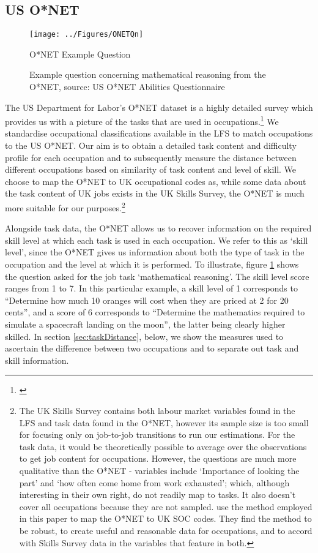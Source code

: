 \documentclass[preprint,12pt,authoryear]{elsarticle}
\begin{document}
\subsection{US O*NET}
\label{sec:ONET}

\begin{figure}[t!]
	\centering
	\texttt{[image: ../Figures/ONETQn]}
	\caption{O*NET Example Question}
	\caption*{\footnotesize{Example question concerning mathematical reasoning from the O*NET, source: US O*NET Abilities Questionnaire}}
	\label{fig:ONETQn}
\end{figure}

The US Department for Labor's O*NET dataset is a highly detailed survey which provides us with a picture of the tasks that are used in occupations.\footnote{\cite{ONET}} We standardise occupational classifications available in the LFS to match occupations to the US O*NET. Our aim is to obtain a detailed task content and difficulty profile for each occupation and to subsequently measure the distance between different occupations based on similarity of task content and level of skill. We choose to map the O*NET to UK occupational codes as, while some data about the task content of UK jobs exists in the UK Skills Survey, the O*NET is much more suitable for our purposes.\footnote{The UK Skills Survey contains both labour market variables found in the LFS and task data found in the O*NET, however its sample size is too small for focusing only on job-to-job transitions to run our estimations. For the task data, it would be theoretically possible to average over the observations to get job content for occupations. However, the questions are much more qualitative than the O*NET - variables include `Importance of looking the part' and `how often come home from work exhausted'; which, although interesting in their own right, do not readily map to tasks. It also doesn't cover all occupations because they are not sampled. \cite{ONETreport} use the method employed in this paper to map the O*NET to UK SOC codes. They find the method to be robust, to create useful and reasonable data for occupations, and to accord with Skills Survey data in the variables that feature in both.} 

Alongside task data, the O*NET allows us to recover information on the required skill level at which each task is used in each occupation. We refer to this as `skill level', since the O*NET gives us information about both the type of task in the occupation and the level at which it is performed. To illustrate, figure \ref{fig:ONETQn} shows the question asked for the job task `mathematical reasoning'. The skill level score ranges from 1 to 7. In this particular example, a skill level of 1 corresponds to ``Determine how much 10 oranges will cost when they are priced at 2 for 20 cents'', and a score of 6 corresponds to ``Determine the mathematics required to simulate a spacecraft landing on the moon'', the latter being clearly higher skilled. In section \ref{sec:taskDistance}, below, we show the measures used to ascertain the difference between two occupations and to separate out task and skill information. 
\end{document}
